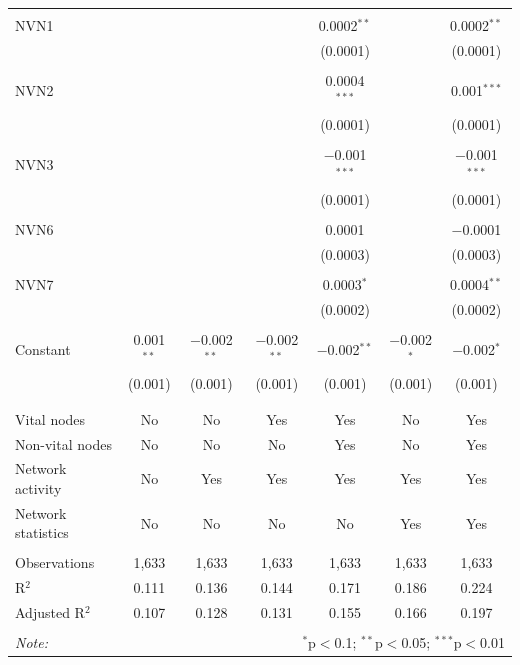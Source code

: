 \begin{table}[!htbp]
\begin{tabular}{@{\extracolsep{5pt}}lcccccc}
  & & & & & & \\ 
 NVN1 &  &  &  & 0.0002$^{**}$ &  & 0.0002$^{**}$ \\ 
  &  &  &  & (0.0001) &  & (0.0001) \\ 
  & & & & & & \\ 
 NVN2 &  &  &  & 0.0004$^{***}$ &  & 0.001$^{***}$ \\ 
  &  &  &  & (0.0001) &  & (0.0001) \\ 
  & & & & & & \\ 
 NVN3 &  &  &  & $-$0.001$^{***}$ &  & $-$0.001$^{***}$ \\ 
  &  &  &  & (0.0001) &  & (0.0001) \\ 
  & & & & & & \\ 
 NVN6 &  &  &  & 0.0001 &  & $-$0.0001 \\ 
  &  &  &  & (0.0003) &  & (0.0003) \\ 
  & & & & & & \\ 
 NVN7 &  &  &  & 0.0003$^{*}$ &  & 0.0004$^{**}$ \\ 
  &  &  &  & (0.0002) &  & (0.0002) \\ 
  & & & & & & \\ 
 Constant & 0.001$^{**}$ & $-$0.002$^{**}$ & $-$0.002$^{**}$ & $-$0.002$^{**}$ & $-$0.002$^{*}$ & $-$0.002$^{*}$ \\ 
  & (0.001) & (0.001) & (0.001) & (0.001) & (0.001) & (0.001) \\ 
  & & & & & & \\ 
\hline \\[-1.8ex] 
Vital nodes & No & No & Yes & Yes & No & Yes \\ 
Non-vital nodes & No & No & No & Yes & No & Yes \\ 
Network activity & No & Yes & Yes & Yes & Yes & Yes \\ 
Network statistics & No & No & No & No & Yes & Yes \\ 
\hline &  &  &  &  &  &  \\ 
Observations & 1,633 & 1,633 & 1,633 & 1,633 & 1,633 & 1,633 \\ 
R$^{2}$ & 0.111 & 0.136 & 0.144 & 0.171 & 0.186 & 0.224 \\ 
Adjusted R$^{2}$ & 0.107 & 0.128 & 0.131 & 0.155 & 0.166 & 0.197 \\ 
\hline 
\hline \\[-1.8ex] 
\textit{Note:}  & \multicolumn{6}{r}{$^{*}$p$<$0.1; $^{**}$p$<$0.05; $^{***}$p$<$0.01} \\ 
\end{tabular} 
\end{table} 
